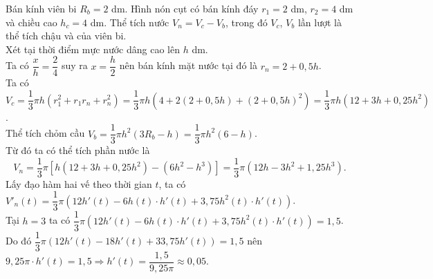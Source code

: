 \begin{ex}
{\begin{center}
\begin{tikzpicture}[scale=0.8,>=stealth]
			\end{tikzpicture}
		\end{center}
		Bán kính viên bi $R_b = 2$ dm. Hình nón cụt có bán kính đáy $r_1=2$ dm, $r_2=4$ dm và chiều cao $h_c=4$ dm. Thể tích nước $V_n = V_{c} - V_{b}$, trong đó $V_c$, $V_b$ lần lượt là thể tích chậu và của viên bi.\\ Xét tại thời điểm mực nước dâng cao lên $h$ dm.\\
		Ta có $\dfrac{x}{h}=\dfrac{2}{4}$ suy ra $x=\dfrac{h}{2}$ nên bán kính mặt nước tại đó là $r_n=2+0{,}5h$. \\
		Ta có $V_{c} = \dfrac{1}{3}\pi h \left(r_1^2 + r_1r_n + r_n^2\right) = \dfrac{1}{3}\pi h \left(4 + 2(2+0,5h) + (2+0,5h)^2\right)=\dfrac{1}{3}\pi h(12+3h+0{,}25h^2)$.\\
		Thể tích chỏm cầu $V_{b} = \dfrac{1}{3}\pi h^2 (3R_b - h) = \dfrac{1}{3}\pi h^2 (6 - h)$.\\
		Từ đó ta có thể tích phần nước là $$V_n = \dfrac{1}{3}\pi [h(12 + 3h + 0,25h^2) - (6h^2 - h^3)] = \dfrac{1}{3}\pi (12h - 3h^2 + 1,25h^3).$$
		Lấy đạo hàm hai vế theo thời gian $t$, ta có $V'_n(t) = \dfrac{1}{3}\pi (12h'(t) - 6h(t)\cdot h'(t) + 3,75h^2(t)\cdot h'(t))$.\\
		Tại $h=3$ ta có $\dfrac{1}{3}\pi (12h'(t) - 6h(t)\cdot h'(t) + 3,75h^2(t)\cdot h'(t)) = 1,5$.\\
		Do đó $\dfrac{1}{3}\pi (12h'(t)-18h'(t)+33{,}75h'(t)) = 1,5$ nên $9,25\pi\cdot h'(t) = 1,5\Rightarrow h'(t) = \dfrac{1,5}{9,25\pi} \approx 0,05$.
	}
\end{ex}

\newpage
{}
